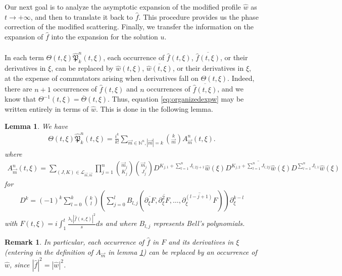 \documentclass[a4paper, 15pt]{article}
\numberwithin{equation}{section}
\newtheorem{rem}[defi]{Remark}
\newtheorem{lem}[defi]{Lemma}
\begin{document}
Our next goal is to analyze the asymptotic expansion of the modified profile $\hat{w}$ as $t\to+\infty$, and then to translate it back to $\hat{f}$. This procedure provides us the phase correction of the modified scattering. Finally, we transfer the information on the expansion of $\hat{f}$ into the expansion for the solution $u$. \\\\
In each term $\Theta(t,\xi)\hat{\mathfrak{P}}^n_k(t,\xi)$, each occurrence of $\hat{f}(t,\xi)$, $\overline{\hat{f}(t,\xi)}$, or their derivatives in $\xi$, can be replaced by $\hat{w}(t,\xi)$, $\overline{\hat{w}(t,\xi)}$, or their derivatives in $\xi$, at the expense of commutators arising when derivatives fall on $\Theta(t,\xi)$. Indeed, there are $n+1$ occurrences of $\hat{f}(t,\xi)$ and $n$ occurrences of $\overline{\hat{f}(t,\xi)}$, and we know that $\Theta^{-1}(t,\xi)=\overline{\Theta}(t,\xi)$. Thus, equation \eqref{eq:organizedexpw} may be written entirely in terms of $\hat{w}$. This is done in the following lemma. 
\begin{lem}
\label{lem:nonlinearityPexactform}
We have 
\begin{align}
    \Theta(t,\xi)\hat{\mathfrak{P}}^n_k(t,\xi)=\frac{i^k}{k!}\sum_{\overrightarrow{m}\in\mathbb{N}^n,|\overrightarrow{m}|=k}\binom{k}{\overrightarrow{m}}
A^n_{\overrightarrow{m}}(t,\xi).
\end{align}
where  
\begin{align}
\label{eq:Adefined}
    A^n_{\overrightarrow{m}}(t,\xi)=\sum_{(J,K)\in\mathscr{L}_{\overrightarrow{m},\overrightarrow{m}}}\prod^n_{j=1}\binom{\overrightarrow{m}_j}{K_j}\binom{\overrightarrow{m}_j}{J_j}D^{K_{j,1}+\sum_{l=1}^{n}J_{l,2j+1}}\hat{w}(\xi)\overline{D^{K_{j,2}+\sum_{l=1}^{n}J_{l,2j}}\hat{w}(\xi)}D^{\sum_{l=1}^{n}J_{l,1}}\hat{w}(\xi)
\end{align}
for 
\begin{align}
\label{eq:operatorDk}
    D^k=(-1)^k\sum_{l=0}^k\binom{k}{l}(\sum_{j=0}^lB_{l,j}(\overline{\partial_\xi F},\overline{\partial^2_\xi F},\dots,\overline{\partial_\xi^{(l-j+1)}F}))\partial_\xi^{k-l}
\end{align}
with $F(t,\xi)=i\int^t_1\frac{\lambda_1|\hat{f}(s,\xi)|^2}{s}ds$ and where $B_{l,j}$ represents Bell's polynomials.\\
\end{lem}
\begin{rem}
\label{rem:nonlinearityPexactform}
In particular, each occurrence of $\hat{f}$ in $F$ and its derivatives in $\xi$ (entering in the definition of $
A_{\overrightarrow{m}}$ in lemma \ref{lem:nonlinearityPexactform}) can be replaced by an occurrence of $\hat{w}$, since $|\hat{f}|^2=|\hat{w}|^2$.
\end{rem}
\end{document}
